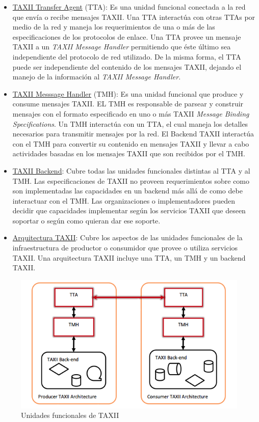 \begin{itemize}
  \item \underline{TAXII Transfer Agent} (TTA): Es una unidad funcional conectada a la red 
  que envía o recibe mensajes TAXII. Una TTA interactúa con otras TTAs por medio 
  de la red y maneja los requerimientos de una o más de las especificaciones de 
  los protocolos de enlace. Una TTA provee un mensaje TAXII a un \textit{TAXII Message 
  Handler} permitiendo que éste último sea independiente del protocolo de red 
  utilizado. De la misma forma, el TTA puede ser independiente del contenido de 
  los mensajes TAXII, dejando el manejo de la información al \textit{TAXII Message 
  Handler}.
  \item \underline{TAXII Messsage Handler} (TMH): Es una unidad funcional que produce y 
  consume mensajes TAXII. EL TMH es responsable de parsear y construir mensajes 
  con el formato especificado en uno o más TAXII \textit{Message Binding Specifications}. 
  Un TMH interactúa con un TTA, el cual maneja los detalles necesarios para 
  transmitir mensajes por la red. El Backend TAXII interactúa con el TMH para 
  convertir su contenido en mensajes TAXII y llevar a cabo actividades basadas 
  en los mensajes TAXII que son recibidos por el TMH.
  \item \underline{TAXII Backend}: Cubre todas las unidades funcionales distintas al TTA y 
  al TMH. Las especificaciones de TAXII no proveen requerimientos sobre como son 
  implementadas las capacidades en un backend más allá de como debe interactuar 
  con el TMH. Las organizaciones o implementadores pueden decidir que 
  capacidades implementar según los servicios TAXII que deseen soportar o según 
  como quieran dar ese soporte.
  \item \underline{Arquitectura TAXII}: Cubre los aspectos de las unidades funcionales de la 
  infraestructura de productor o consumidor que provee o utiliza servicios 
  TAXII. Una arquitectura TAXII incluye una TTA, un TMH y un backend TAXII.
  \end{itemize}

\begin{figure}[ht!]
  \centering
    \includegraphics[width=150mm]{./images/TAXIIArchitecture.png}
    \caption{Unidades funcionales de TAXII \protect\cite{b1}}
\end{figure}


